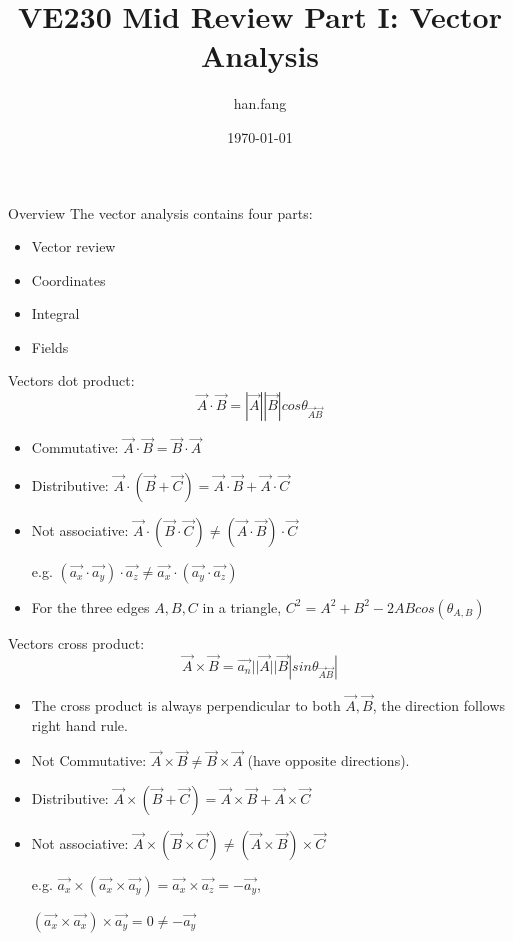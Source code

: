 \documentclass[xcolor={dvipsnames}]{beamer}
\title[VE230 RC slides week 1]{VE230 Mid Review Part I: Vector Analysis}
\author{han.fang }
\date{\today}
\begin{document}
\begin{frame}
\titlepage
\end{frame}
\begin{frame}{Overview}
The vector analysis contains four parts:
\newline
\begin{itemize}
	\item Vector review
	\item Coordinates
	\item Integral
	\item Fields
\end{itemize}
\end{frame}
\begin{frame}{Vectors}
dot product:
    $$
    \vec{A} \cdot \vec{B} = |\vec{A}||\vec{B}|cos\theta_{\vec{A}\vec{B}}
    $$
    \begin{itemize}
        \item Commutative: $\vec{A}\cdot\vec{B} = \vec{B}\cdot\vec{A}$
        \item Distributive: $\vec{A}\cdot(\vec{B} + \vec{C}) = \vec{A}\cdot\vec{B}+\vec{A}\cdot\vec{C}$
        \item Not associative: $\vec{A}\cdot(\vec{B}\cdot\vec{C}) \neq (\vec{A}\cdot\vec{B})\cdot\vec{C}$ 
        
        e.g. $(\vec{a_x}\cdot\vec{a_y})\cdot\vec{a_z} \neq \vec{a_x}\cdot(\vec{a_y}\cdot\vec{a_z})$
        \item For the three edges $A,B,C$ in a triangle, $C^2 = A^2 + B^2 - 2ABcos(\theta_{A,B})$
    \end{itemize}
\end{frame}
\begin{frame}{Vectors}
cross product:
    $$
    \vec{A}\times\vec{B} = \vec{a_n}||\vec{A}||\vec{B}|sin\theta_{\vec{A}\vec{B}}|
    $$
    \begin{itemize}
        \item The cross product is always perpendicular to both $\vec{A}, \vec{B}$, the direction follows right hand rule.
        \item Not Commutative: $\vec{A}\times\vec{B}\neq\vec{B}\times\vec{A}$ (have opposite directions).
        \item Distributive: $\vec{A}\times(\vec{B}+\vec{C}) = \vec{A}\times\vec{B} + \vec{A}\times\vec{C}$
        \item Not associative: $\vec{A}\times(\vec{B}\times\vec{C}) \neq (\vec{A}\times\vec{B})\times\vec{C}$
        
        e.g. $\vec{a_x}\times(\vec{a_x}\times\vec{a_y}) = \vec{a_x}\times\vec{a_z} = -\vec{a_y}$, 

        $(\vec{a_x}\times\vec{a_x})\times\vec{a_y} = 0\neq -\vec{a_y}$
    \end{itemize}
\end{frame}
\end{document}
